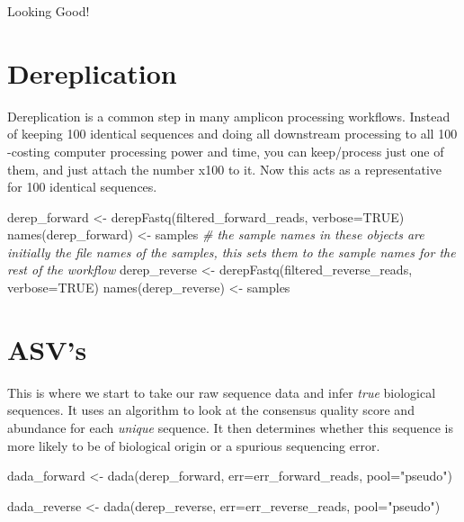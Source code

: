 \documentclass[
]{book}
\newenvironment{Shaded}{\begin{snugshade}}{\end{snugshade}}
\newcommand{\AttributeTok}[1]{\textcolor[rgb]{0.77,0.63,0.00}{#1}}
\newcommand{\CommentTok}[1]{\textcolor[rgb]{0.56,0.35,0.01}{\textit{#1}}}
\newcommand{\ConstantTok}[1]{\textcolor[rgb]{0.00,0.00,0.00}{#1}}
\newcommand{\FunctionTok}[1]{\textcolor[rgb]{0.00,0.00,0.00}{#1}}
\newcommand{\NormalTok}[1]{#1}
\newcommand{\OtherTok}[1]{\textcolor[rgb]{0.56,0.35,0.01}{#1}}
\newcommand{\StringTok}[1]{\textcolor[rgb]{0.31,0.60,0.02}{#1}}
\begin{document}
Looking Good!

\hypertarget{dereplication}{%
\section{Dereplication}\label{dereplication}}

Dereplication is a common step in many amplicon processing workflows. Instead of keeping 100 identical sequences and doing all downstream processing to all 100 -costing computer processing power and time, you can keep/process just one of them, and just attach the number x100 to it. Now this acts as a representative for 100 identical sequences.

\begin{Shaded}
\begin{Highlighting}[]
\NormalTok{derep\_forward }\OtherTok{\textless{}{-}} \FunctionTok{derepFastq}\NormalTok{(filtered\_forward\_reads, }\AttributeTok{verbose=}\ConstantTok{TRUE}\NormalTok{)}
\FunctionTok{names}\NormalTok{(derep\_forward) }\OtherTok{\textless{}{-}}\NormalTok{ samples }\CommentTok{\# the sample names in these objects are initially the file names of the samples, this sets them to the sample names for the rest of the workflow}
\NormalTok{derep\_reverse }\OtherTok{\textless{}{-}} \FunctionTok{derepFastq}\NormalTok{(filtered\_reverse\_reads, }\AttributeTok{verbose=}\ConstantTok{TRUE}\NormalTok{)}
\FunctionTok{names}\NormalTok{(derep\_reverse) }\OtherTok{\textless{}{-}}\NormalTok{ samples}
\end{Highlighting}
\end{Shaded}

\hypertarget{asvs}{%
\section{ASV's}\label{asvs}}

This is where we start to take our raw sequence data and infer \emph{true} biological sequences.
It uses an algorithm to look at the consensus quality score and abundance for each \emph{unique} sequence. It then determines whether this sequence is more likely to be of biological origin or a spurious sequencing error.

\begin{Shaded}
\begin{Highlighting}[]
\NormalTok{dada\_forward }\OtherTok{\textless{}{-}} \FunctionTok{dada}\NormalTok{(derep\_forward, }\AttributeTok{err=}\NormalTok{err\_forward\_reads, }\AttributeTok{pool=}\StringTok{"pseudo"}\NormalTok{)}

\NormalTok{dada\_reverse }\OtherTok{\textless{}{-}} \FunctionTok{dada}\NormalTok{(derep\_reverse, }\AttributeTok{err=}\NormalTok{err\_reverse\_reads, }\AttributeTok{pool=}\StringTok{"pseudo"}\NormalTok{)}
\end{Highlighting}
\end{Shaded}
\end{document}
